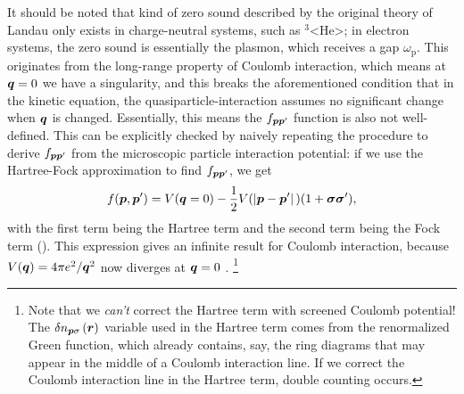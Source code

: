\documentclass[hyperref, a4paper]{article}
\def\ce#1{<#1>}%
\begin{document}
It should be noted that kind of zero sound described by the original theory of Landau 
only exists in charge-neutral systems, 
such as $^3$\ce{He};
in electron systems,
the zero sound is essentially the plasmon, 
which receives a gap $\omega_{\text{p}}$.
This originates from the long-range property of Coulomb interaction,
which means at $\vb*{q} = 0$ we have a singularity, 
and this breaks the aforementioned condition 
that in the kinetic equation, 
the quasiparticle-interaction assumes no significant change when $\vb*{q}$ is changed. 
Essentially, this means the $f_{\vb*{p} \vb*{p}'}$ function is also not well-defined.
This can be explicitly checked by naively repeating the procedure 
to derive $f_{\vb*{p} \vb*{p}'}$ from the microscopic particle interaction potential:
if we use the Hartree-Fock approximation to find $f_{\vb*{p} \vb*{p}'}$, 
we get 
\begin{equation}
    f(\vb*{p}, \vb*{p}') = 
    V(\vb*{q} = 0) - \frac{1}{2} V(\abs*{\vb*{p} - \vb*{p}'}) (1 + \vb*{\sigma} \vb*{\sigma}'),
\end{equation}
with the first term being the Hartree term 
and the second term being the Fock term
().
This expression gives an infinite result for Coulomb interaction, 
because $V(\vb*{q}) = 4 \pi e^2 / \vb*{q}^2$ now diverges at $\vb*{q} = 0$ \cite{silin1958theory}.%
\footnote{
    Note that we \emph{can't} correct the Hartree term with screened Coulomb potential!
    The $\var{n}_{\vb*{p} \sigma}(\vb*{r})$ variable used in the Hartree term 
    comes from the renormalized Green function, 
    which already contains, say, the ring diagrams that may appear 
    in the middle of a Coulomb interaction line.
    If we correct the Coulomb interaction line in the Hartree term, 
    double counting occurs. 
}
\end{document}
